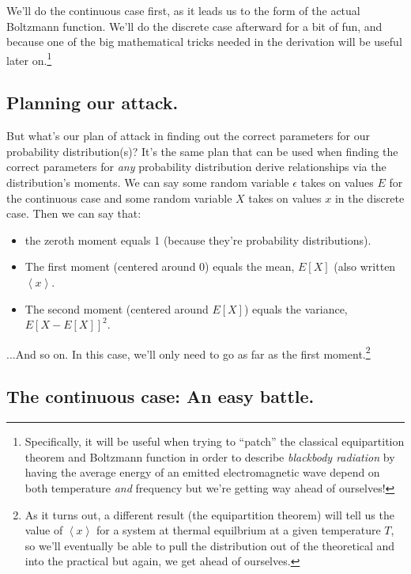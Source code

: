 \documentclass[letterpaper,12pt]{report}
\providecommand{\tightlist}{%
  \setlength{\itemsep}{0pt}\setlength{\parskip}{0pt}}
\begin{document}
We'll do the continuous case first, as it leads us to the form of the actual Boltzmann function.
We'll do the discrete case afterward for a bit of fun, and because one of the big
mathematical tricks needed in the derivation will be useful later on.\footnote{ 
  Specifically, it will be useful when trying to ``patch'' the classical equipartition theorem 
  and Boltzmann function in order to describe \emph{blackbody radiation}
  by having the average energy of an emitted electromagnetic wave 
  depend on both temperature
  \emph{and} frequency \textemdash{} but we're getting way ahead of ourselves!
}

\subsection{Planning our attack.}

But what's our plan of attack in finding out the correct parameters for our probability
distribution(s)? It's the same plan that can be used
when finding the correct parameters for \emph{any} probability distribution 
\textemdash{} derive relationships
via the distribution's moments. We can say some random variable \(\epsilon\) takes on
values \(E\) for the continuous case and some random variable \(X\) takes on values \(x\)
in the discrete case. Then we can say that:
\begin{itemize}
  \tightlist
  \item
    the zeroth moment equals 1 (because they're probability distributions).
  \item
    The first moment (centered around 0) equals the mean, 
    \(E[X]\) (also written \(\left<x\right>\).
  \item
    The second moment (centered around \(E[X]\)) equals the variance, \(E[X-E[X]]^2\).
\end{itemize}

...And so on. In this case, we'll only need to go as far as the first moment.\footnote
{
  As it turns out, a different result (the equipartition theorem) will tell us the value
  of \(\left<x\right>\) for a system at thermal equilbrium at a given temperature \(T\),
  so we'll eventually be able to pull the distribution out of the theoretical and into
  the practical \textemdash{} but again, we get ahead of ourselves.
}


\subsection{The continuous case: An easy battle.}
\end{document}
